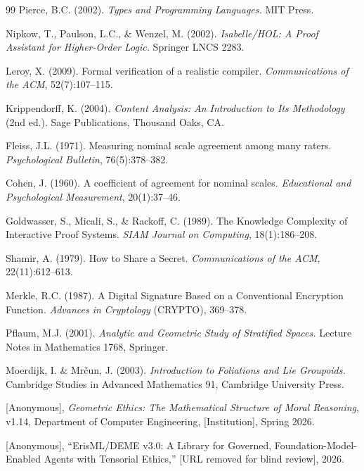 \documentclass[11pt,letterpaper]{article}
\theoremstyle{definition}
\theoremstyle{remark}
\begin{document}
\begin{thebibliography}{99}
Pierce, B.C. (2002). \emph{Types and Programming Languages.} MIT Press.

Nipkow, T., Paulson, L.C., \& Wenzel, M. (2002). \emph{Isabelle/HOL: A Proof Assistant for Higher-Order Logic.} Springer LNCS 2283.

Leroy, X. (2009). Formal verification of a realistic compiler. \emph{Communications of the ACM}, 52(7):107--115.

Krippendorff, K. (2004). \emph{Content Analysis: An Introduction to Its Methodology} (2nd ed.). Sage Publications, Thousand Oaks, CA.

Fleiss, J.L. (1971). Measuring nominal scale agreement among many raters. \emph{Psychological Bulletin}, 76(5):378--382.

Cohen, J. (1960). A coefficient of agreement for nominal scales. \emph{Educational and Psychological Measurement}, 20(1):37--46.

Goldwasser, S., Micali, S., \& Rackoff, C. (1989). The Knowledge Complexity of Interactive Proof Systems. \emph{SIAM Journal on Computing}, 18(1):186--208.

Shamir, A. (1979). How to Share a Secret. \emph{Communications of the ACM}, 22(11):612--613.

Merkle, R.C. (1987). A Digital Signature Based on a Conventional Encryption Function. \emph{Advances in Cryptology} (CRYPTO), 369--378.

Pflaum, M.J. (2001). \emph{Analytic and Geometric Study of Stratified Spaces.} Lecture Notes in Mathematics 1768, Springer.

Moerdijk, I. \& Mr\v{c}un, J. (2003). \emph{Introduction to Foliations and Lie Groupoids.} Cambridge Studies in Advanced Mathematics 91, Cambridge University Press.

[Anonymous], \emph{Geometric Ethics: The Mathematical Structure of Moral Reasoning}, v1.14, Department of Computer Engineering, [Institution], Spring 2026.

[Anonymous], ``ErisML/DEME v3.0: A Library for Governed, Foundation-Model-Enabled Agents with Tensorial Ethics,'' [URL removed for blind review], 2026.

\end{thebibliography}
\end{document}
